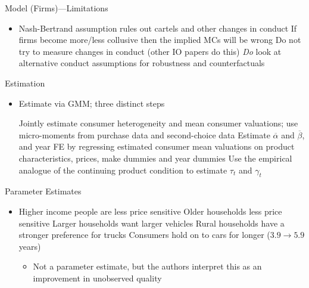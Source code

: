 \documentclass{beamer}
\begin{document}
%
\begin{frame}{Model (Firms)---Limitations}
  \begin{itemize}
  \item Nash-Bertrand assumption rules out cartels and other changes in conduct
    \vitem If firms become more/less collusive then the implied MCs will be wrong
    \vitem Do not try to measure changes in conduct (other IO papers do this)
    \vitem \emph{Do} look at alternative conduct assumptions for robustness and counterfactuals
  \end{itemize}
\end{frame}
%
\begin{frame}{Estimation}
  \begin{itemize}
  \item Estimate via GMM; three distinct steps
    \begin{enumerate}
      \vitem Jointly estimate consumer heterogeneity and mean consumer valuations; use micro-moments from purchase data and second-choice data
      \vitem Estimate $\overline{\alpha}$ and $\overline{\beta}$, and year FE by regressing estimated consumer mean valuations on product characteristics, prices, make dummies and year dummies
  \vitem Use the empirical analogue of the continuing product condition to estimate $\tau_t$ and $\gamma_t$
    \end{enumerate}
  \end{itemize}
\end{frame}
%
\begin{frame}{Parameter Estimates}
  \begin{itemize}
  \item Higher income people are less price sensitive
    \vitem Older households less price sensitive
    \vitem Larger households want larger vehicles
    \vitem Rural households have a stronger preference for trucks
    \vitem Consumers hold on to cars for longer ($3.9 \to 5.9$ years)
    \begin{itemize}
    \item Not a parameter estimate, but the authors interpret this as an improvement in unobserved quality
    \end{itemize}
  \end{itemize}
\end{frame}
%
\end{document}
